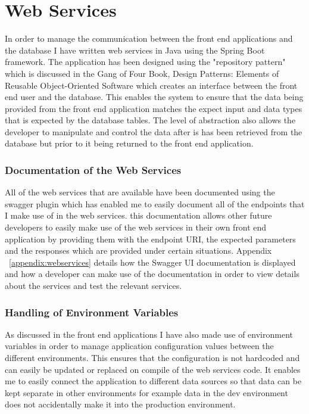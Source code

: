 \documentclass[a4paper,11pt]{report}
\begin{document}
\section{Web Services}
In order to manage the communication between the front end applications and the database I have written web services in Java using the Spring Boot framework. 
The application has been designed using the "repository pattern" which is discussed in the Gang of Four Book, Design Patterns: Elements of Reusable Object-Oriented Software\cite{gamma1994design} which creates an interface between the front end user and the database. This enables the system to ensure that the data being provided from the front end application matches the expect input and data types that is expected by the database tables. The level of abstraction also allows the developer to manipulate and control the data after is has been retrieved from the database but prior to it being returned to the front end application.

\subsubsection{Documentation of the Web Services}
All of the web services that are available have been documented using the swagger plugin which has enabled me to easily document all of the endpoints that I make use of in the web services. this documentation allows other future developers to easily make use of the web services in their own front end application by providing them with the endpoint URI, the expected parameters and the responses which are provided under certain situations. Appendix ~\ref{appendix:webservices} details how the Swagger UI documentation is displayed and how a developer can make use of the documentation in order to view details about the services and test the relevant services.

\subsubsection{Handling of Environment Variables}
As discussed in the front end applications I have also made use of environment variables in order to manage application configuration values between the different environments. This ensures that the configuration is not hardcoded and can easily be updated or replaced on compile of the web services code. It enables me to easily connect the application to different data sources so that data can be kept separate in other environments for example data in the dev environment does not accidentally make it into the production environment. 
\end{document}
